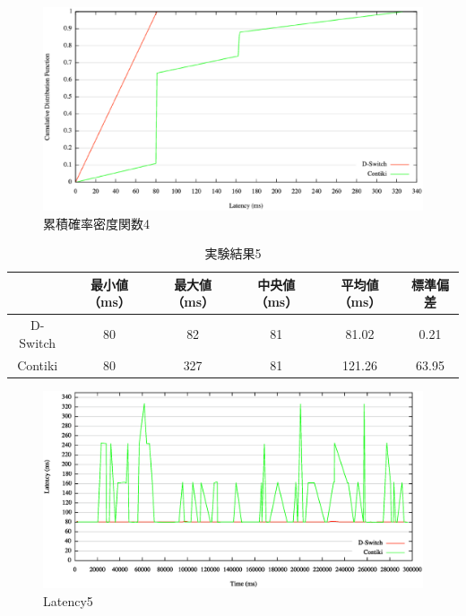 \begin{figure}[htbp]
 \begin{center}
  \includegraphics[width=120mm]{./images/cdf4.eps}
 \end{center}
 \caption{累積確率密度関数4}
 \label{fig:cdf4}
\end{figure}



\begin{table}[htbp]
  \centering
  \caption{実験結果5}
  \begin{tabular}{|c||c|c|c|c|c|} \hline
    \backslashbox{}{} & 最小値（ms） & 最大値（ms） & 中央値（ms） & 平均値（ms） & 標準偏差 \\ \hline \hline
    D-Switch & 80 & 82 & 81 & 81.02 & 0.21 \\ \hline
    Contiki & 80 & 327 & 81 & 121.26 & 63.95 \\ \hline
  \end{tabular}
  \label{tab:latency5}
\end{table}

\begin{figure}[htbp]
 \begin{center}
  \includegraphics[width=120mm]{./images/latency5.eps}
 \end{center}
 \caption{Latency5}
 \label{fig:latency5}
\end{figure}

